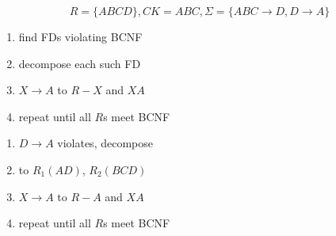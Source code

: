 \[
R=\{ABCD\}, CK = ABC, \Sigma=\{ABC\rightarrow D,D\rightarrow A\}
\]

\begin{minipage}{0.5\linewidth}
\begin{enumerate}
\item find FDs violating BCNF
\item decompose each such FD
\item[] $X\rightarrow A$ to $R-X$ and $XA$
\item repeat until all $R$s meet BCNF
\end{enumerate}
\end{minipage}
\begin{minipage}{0.5\linewidth}
\begin{enumerate}
\item $D\rightarrow A$ violates, decompose
\item to $R_{1}(AD)$, $R_{2}(BCD)$
\item[] $X\rightarrow A$ to $R-A$ and $XA$
\item repeat until all $R$s meet BCNF
\end{enumerate}
\end{minipage}
